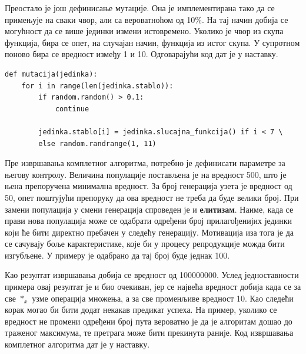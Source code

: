 \documentclass[a4paper]{article}
\begin{document}
Преостало је још дефинисање мутације. Она је имплементирана тако да се примењује на сваки чвор, али са вероватноћом од 10\%. На тај начин добија се могућност да се више јединки измени истовремено.
Уколико је чвор из скупа функција, бира се опет, на случајан начин, функција из истог скупа. У супротном поново бира се вредност између 1 и 10. Одговарајући код дат је у наставку.

\bigskip
\begin{lstlisting}[frame=single]
def mutacija(jedinka):
    for i in range(len(jedinka.stablo)):
        if random.random() > 0.1:
            continue

        jedinka.stablo[i] = jedinka.slucajna_funkcija() if i < 7 \
        else random.randrange(1, 11)
\end{lstlisting}

Пре извршавања комплетног алгоритма, потребно је дефинисати параметре за његову контролу. Величина популације постављена је на вредност 500, што је њена препоручена минимална вредност. За број генерација узета је вредност од 50, опет поштујући препоруку да ова вредност не треба да буде велики број. При замени популација у смени генерација спроведен је и \textbf{елитизам}. Наиме, када се прави нова популација може се одабрати одређени број прилагођенијих јединки који ће бити директно пребачен у следећу генерацију. Мотивација иза тога је да се сачувају боље карактеристике, које би у процесу репродукције можда бити изгубљене. У примеру је одабрано да тај број буде једнак 100. \newline

Као резултат извршавања добија се вредност од 100000000. Услед једноставности примера овај резултат је и био очекиван, јер се највећа вредност добија када се за све $*_x$ узме операција множења, а за све променљиве вредност 10. Као следећи корак могао би бити додат некакав предикат успеха. На пример, уколико се вредност не промени одређени број пута вероватно је да је алгоритам дошао до траженог максимума, те претрага може бити прекинута раније. Код извршавања комплетног алгоритма дат је у наставку.
\end{document}

